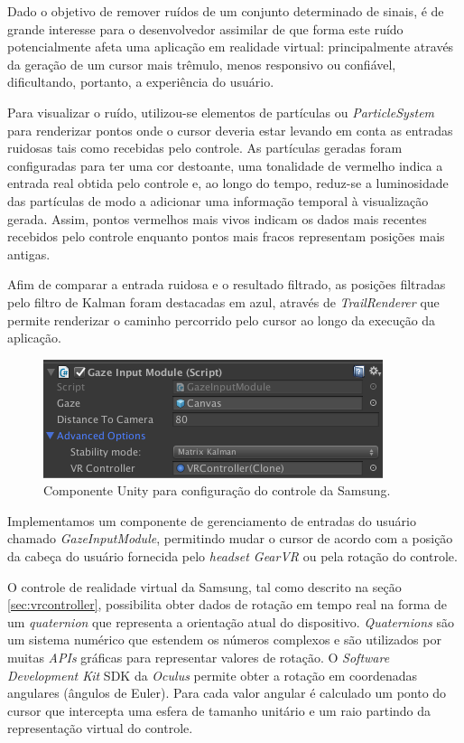 \documentclass[conference]{IEEEtran}
\begin{document}
Dado o objetivo de remover ruídos de um conjunto determinado de sinais, é de grande interesse para o desenvolvedor assimilar de que forma este ruído potencialmente afeta uma aplicação em realidade virtual: principalmente através da geração de um cursor mais trêmulo, menos responsivo ou confiável, dificultando, portanto, a experiência do usuário.


Para visualizar o ruído, utilizou-se elementos de partículas ou \textit{ParticleSystem} para renderizar pontos onde o cursor deveria estar levando em conta as entradas ruidosas tais como recebidas pelo controle. As partículas geradas foram configuradas para ter uma cor destoante, uma tonalidade de vermelho indica a entrada real obtida pelo controle e, ao longo do tempo, reduz-se a luminosidade das partículas de modo a adicionar uma informação temporal à visualização gerada. Assim, pontos vermelhos mais vivos indicam os dados mais recentes recebidos pelo controle enquanto pontos mais fracos representam posições mais antigas.

Afim de comparar a entrada ruidosa e o resultado filtrado, as posições filtradas pelo filtro de Kalman foram destacadas em azul, através de \textit{TrailRenderer} que permite renderizar o caminho percorrido pelo cursor ao longo da execução da aplicação.

\begin{figure}[ht]
\centering
\includegraphics[width=.5\textwidth]{images/controller_input.png}
\caption{Componente Unity para configuração do controle da Samsung.}
\label{fig:controllercomponent}
\end{figure}

Implementamos um componente de gerenciamento de entradas do usuário chamado \textit{GazeInputModule}, permitindo mudar o cursor de acordo com a posição da cabeça do usuário fornecida pelo \textit{headset GearVR} ou pela rotação do controle.


O controle de realidade virtual da Samsung, tal como descrito na seção \ref{sec:vrcontroller}, possibilita obter dados de rotação em tempo real \cite{gearvrinputdocs} na forma de um \textit{quaternion} \cite{quaternionhamilton1844ii} que representa a orientação atual do dispositivo. \textit{Quaternions} são um sistema numérico que estendem os números complexos e são utilizados por muitas \textit{APIs} gráficas para representar valores de rotação. O \textit{Software Development Kit} SDK da \textit{Oculus} permite obter a rotação em coordenadas angulares (ângulos de Euler). Para cada valor angular é calculado um ponto do cursor que intercepta uma esfera de tamanho unitário e um raio partindo da representação virtual do controle.
\end{document}
